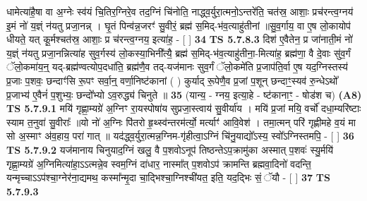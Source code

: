 \documentclass[17pt]{extarticle}
\begin{document}
                  धामेत्या॑है॒षा वा अ॒ग्नेः स्व॑यं चि॒तिर॒ग्निरे॒व तद॒ग्निं चि॑नोति॒ नाद्ध्व॒र्युरा॒त्मनो॒ऽन्तरे॑ति॒ चत॑स्र॒ आशाः॒ प्रच॑रन्त्व॒ग्नय॑ इ॒मं नो॑ य॒ज्ञ्ं न॑यतु प्रजा॒नन्न्  । घृ॒तं पिन्व॑न्न॒जरꣳ॑ सु॒वीरं॒ ब्रह्म॑ स॒मिद्-भ॑व॒त्याहु॑तीनां ॥सु॒व॒र्गाय॒ वा ए॒ष लो॒कायोप॑ धीयते॒ यत् कू॒र्मश्चत॑स्र॒ आशाः॒ प्र च॑रन्त्व॒ग्नय॒ इत्या॑ह॒ - [  ] \textbf{  34} \newline
                  \newline
                                \textbf{ TS 5.7.8.3} \newline
                  दिश॑ ए॒वैतेन॒ प्र जा॑नाती॒मं नो॑ य॒ज्ञ्ं न॑यतु प्रजा॒नन्नित्या॑ह सुव॒र्गस्य॑ लो॒कस्या॒भिनी᳚त्यै॒ ब्रह्म॑ स॒मिद्-भ॑व॒त्याहु॑तीना॒-मित्या॑ह॒ ब्रह्म॑णा॒ वै दे॒वाः सु॑व॒र्गं ॅलो॒कमा॑य॒न्॒ यद्-ब्रह्म॑ण्वत्योप॒दधा॑ति॒ ब्रह्म॑णै॒व तद्-यज॑मानः सुव॒र्गं ॅलो॒कमे॑ति प्र॒जाप॑ति॒र्वा ए॒ष यद॒ग्निस्तस्य॑ प्र॒जाः प॒शवः॒ छन्दाꣳ॑सि रू॒पꣳ सर्वा॒न्॒ वर्णा॒निष्ट॑कानां ( ) कुर्याद् रू॒पेणै॒व प्र॒जां प॒शून् छन्दाꣳ॒॒स्यव॑ रु॒न्धेऽथो᳚ प्र॒जाभ्य॑ ए॒वैनं॑ प॒शुभ्यः॒ छन्दो᳚भ्यो ऽव॒रुद्ध्य॑ चिनुते ॥ \textbf{  35} \newline
                  \newline
                      (यान्य॒ - ग्नय॒ इत्या॒हे - ष्ट॑कानाꣳ॒॒ - षोड॑श च)  \textbf{(A8)} \newline \newline
                                        \textbf{ TS 5.7.9.1} \newline
                  मयि॑ गृह्णा॒म्यग्रे॑ अ॒ग्निꣳ रा॒यस्पोषा॑य सुप्रजा॒स्त्वाय॑ सु॒वीर्या॑य । मयि॑ प्र॒जां मयि॒ वर्चो॑ दधा॒म्यरि॑ष्टाः स्याम त॒नुवा॑ सु॒वीराः᳚ ॥यो नो॑ अ॒ग्निः पि॑तरो हृ॒थ्स्व॑न्तरम॑र्त्यो॒ मर्त्याꣳ॑ आवि॒वेश॑ । तमा॒त्मन् परि॑ गृह्णीमहे व॒यं मा सो अ॒स्माꣳ अ॑व॒हाय॒ परा॑ गात् ॥ यद॑द्ध्व॒र्युरा॒त्मन्न॒ग्निम-गृ॑हीत्वा॒ऽग्निं चि॑नु॒याद्यो᳚ऽस्य॒ स्वो᳚ऽग्निस्तमपि॒ - [  ] \textbf{  36} \newline
                  \newline
                                \textbf{ TS 5.7.9.2} \newline
                  यज॑मानाय चिनुयाद॒ग्निं खलु॒ वै प॒शवोऽनूप॑ तिष्ठन्तेऽप॒क्रामु॑का अस्मात् प॒शवः॑ स्यु॒र्मयि॑ गृह्णा॒म्यग्रे॑ अ॒ग्निमित्या॑हा॒ऽऽत्मन्ने॒व स्वम॒ग्निं दा॑धार॒ नास्मा᳚त् प॒शवोऽप॑ क्रामन्ति ब्रह्मवा॒दिनो॑ वदन्ति॒ यन्मृच्चाऽऽप॑श्चा॒ग्नेर॑ना॒द्यमथ॒ कस्मा᳚न्मृ॒दा चा॒द्भिश्चा॒ग्निश्ची॑यत॒ इति॒ यद॒द्भिः सं॒ ॅयौ - [  ] \textbf{  37} \newline
                  \newline
                                \textbf{ TS 5.7.9.3} \newline
\end{document}
